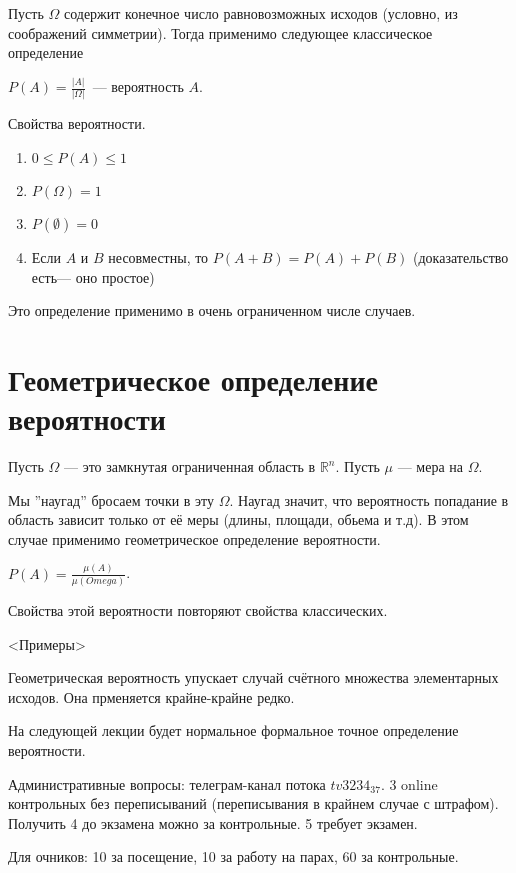 Пусть $\Omega$ содержит конечное число равновозможных исходов (условно, из соображений симметрии).
Тогда применимо следующее классическое определение
\begin{definition} 
    $P(A) = \frac{|A|}{|\Omega|}$~--- вероятность $A$.
\end{definition}

Свойства вероятности. 
\begin{enumerate}
    \item $0 \leqslant P(A) \leqslant 1$
    \item $P(\Omega) = 1$
    \item $P(\emptyset) = 0$
    \item Если $A$ и $B$ несовместны, то $P(A + B) = P(A) + P(B)$ (доказательство есть--- оно простое)
\end{enumerate}

Это определение применимо в очень ограниченном числе случаев.

\section{Геометрическое определение вероятности}
Пусть $\Omega$ --- это замкнутая ограниченная область в $\mathbb{R}^n$.
Пусть $\mu$ --- мера на $\Omega$.

Мы ''наугад'' бросаем точки в эту $\Omega$. 
Наугад значит, что вероятность попадание в область зависит только от её меры (длины, площади, обьема и т.д).
В этом случае применимо геометрическое определение вероятности.

\begin{definition}
    $P(A) = \frac{\mu(A)}{\mu(Omega)}$.
\end{definition}
\begin{remark}
Свойства этой вероятности повторяют свойства классических.
\end{remark}

<Примеры>
 
Геометрическая вероятность упускает случай счётного множества элементарных исходов.
Она прменяется крайне-крайне редко.

На следующей лекции будет нормальное формальное точное определение вероятности.

Административные вопросы: телеграм-канал потока $tv3234_37$.
3 online контрольных без переписываний (переписывания в крайнем случае с штрафом).
Получить 4 до экзамена можно за контрольные. 
5 требует экзамен.

Для очников: 10 за посещение, 10 за работу на парах, 60 за контрольные.





 